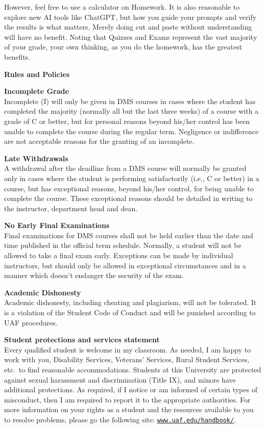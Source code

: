 \documentclass[12pt]{article}
\renewcommand{\emph}[1]{\textsf{\textbf{#1}}}
\newcommand{\localhead}[1]{\par\smallskip\textbf{#1} \smallskip\nobreak\\}%
\def\heading#1{\localhead{\large\emph{#1}}}
\def\subheading#1{\localhead{\emph{#1}}}
\begin{document}
However, feel free to use a calculator on Homework.  It is also reasonable to explore new AI tools like ChatGPT, but how you guide your prompts and verify the results is what matters.  Merely doing cut and paste without understanding will have no benefit.  Noting that Quizzes and Exams represent the vast majority of your grade, your own thinking, as you do the homework, has the greatest benefits.


\heading{Rules and Policies}
\vskip -20pt

\subheading{Incomplete Grade} 
Incomplete (I) will only be given in
  DMS courses in cases where
  the student has completed the majority (normally all but the last
  three weeks) of a course with a grade of C or better, but for
  personal reasons beyond his/her control has been unable to complete
  the course during the regular term. Negligence or indifference are
  not acceptable reasons for the granting of an incomplete. 

\subheading{Late Withdrawals} 
A withdrawal after the deadline from a DMS course will
  normally be granted only in cases where the student is performing
  satisfactorily (i.e., C or better) in a course, but has exceptional
  reasons, beyond his/her control, for being unable to complete the
  course. These exceptional reasons should be detailed in writing to
  the instructor, department head and dean.

\subheading{No Early Final Examinations}
Final examinations for DMS
  courses shall not be held earlier than the date and time published
  in the official term schedule. Normally, a student will not be
  allowed to take a final exam early. Exceptions can be made by
  individual instructors, but should only be allowed in exceptional
  circumstances and in a manner which doesn't endanger the security of
  the exam.

\subheading{Academic Dishonesty}
Academic dishonesty, including cheating and plagiarism, will not
be tolerated.  It is a violation of the Student Code of Conduct
and will be punished according to UAF procedures.


\subheading{Student protections and services statement}
Every qualified student is welcome in my classroom.  As needed, I am happy to work with you, Disability Services, Veterans' Services, Rural Student Services, etc.~to find reasonable accommodations.  Students at this University are protected against sexual harassment and discrimination (Title IX), and minors have additional protections.  As required, if I notice or am informed of certain types of misconduct, then I am required to report it to the appropriate authorities.  For more information on your rights as a student and the resources available to you to resolve problems, please go the following site: \href{https://www.uaf.edu/handbook/}{\texttt{www.uaf.edu/handbook/}}.
\end{document}

